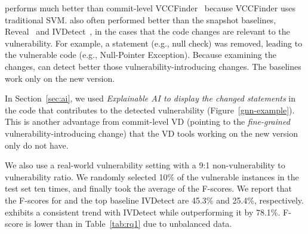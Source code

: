 
{\tool} performs much better than commit-level
VCCFinder~\cite{perl2015vccfinder} because VCCFinder uses traditional
SVM. {\tool} also often performed better than the snapshot baselines,
Reveal~\cite{chakraborty2021deep} and
IVDetect~\cite{li2021vulnerability}, in the cases that the code
changes are relevant to the vulnerability. For example, a statement
(e.g., null check) was removed, leading to the vulnerable code (e.g.,
Null-Pointer Exception). Because examining the changes, {\tool} can
detect better those vulnerability-introducing changes. The baselines
work only on the new version.

In Section~\ref{sec:ai}, we used {\em Explainable AI to display the
changed statements} in the code that contributes to the detected
vulnerability (Figure~\ref{gnn-example}). This is another advantage
from commit-level VD (pointing to the {\em fine-grained}
vulnerability-introducing change) that the VD tools working on the new
version only do not have.






We also use a real-world vulnerability setting with a 9:1
non-vulnerability to vulnerability ratio. We randomly selected 10\% of
the vulnerable instances in the test set ten times, and finally took
the average of the F-scores. We report that the F-scores for
{\tool} and the top baseline IVDetect are 45.3\% and 25.4\%,
respectively. {\tool} exhibits a consistent trend with IVDetect while
outperforming it by 78.1\%. F-score is lower than in Table~\ref{tab:rq1} due to
unbalanced data.

